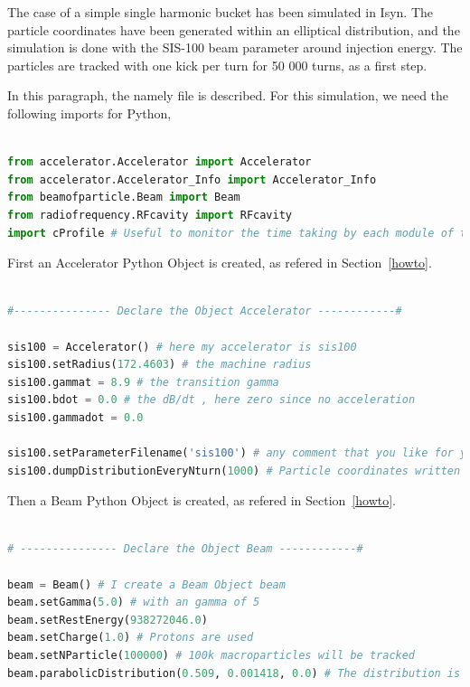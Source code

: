 The case of a simple single harmonic bucket has been simulated in Isyn. The particle coordinates have been generated within an elliptical distribution, and the simulation is done with the SIS-100 beam parameter around injection energy. The particles are tracked with one kick per turn for 50 000 turns, as a first step.

In this paragraph, the namely file  is described.
For this simulation, we need the following imports for Python, 

\begin{lstlisting}[language=Python]

from accelerator.Accelerator import Accelerator
from accelerator.Accelerator_Info import Accelerator_Info
from beamofparticle.Beam import Beam
from radiofrequency.RFcavity import RFcavity
import cProfile # Useful to monitor the time taking by each module of the code. Not mandatory.

\end{lstlisting}

First an Accelerator Python Object is created, as refered in Section~\ref{howto}.

\begin{lstlisting}[language=Python]

#--------------- Declare the Object Accelerator ------------#

sis100 = Accelerator() # here my accelerator is sis100
sis100.setRadius(172.4603) # the machine radius
sis100.gammat = 8.9 # the transition gamma
sis100.bdot = 0.0 # the dB/dt , here zero since no acceleration
sis100.gammadot = 0.0 

sis100.setParameterFilename('sis100') # any comment that you like for your file name in output
sis100.dumpDistributionEveryNturn(1000) # Particle coordinates written into a file every 1000 turns 

\end{lstlisting}

Then a Beam Python Object is created, as refered in Section~\ref{howto}.

\begin{lstlisting}[language=Python]

# --------------- Declare the Object Beam ------------#

beam = Beam() # I create a Beam Object beam
beam.setGamma(5.0) # with an gamma of 5
beam.setRestEnergy(938272046.0)
beam.setCharge(1.0) # Protons are used
beam.setNParticle(100000) # 100k macroparticles will be tracked
beam.parabolicDistribution(0.509, 0.001418, 0.0) # The distribution is chosen Parabolic.

\end{lstlisting}

